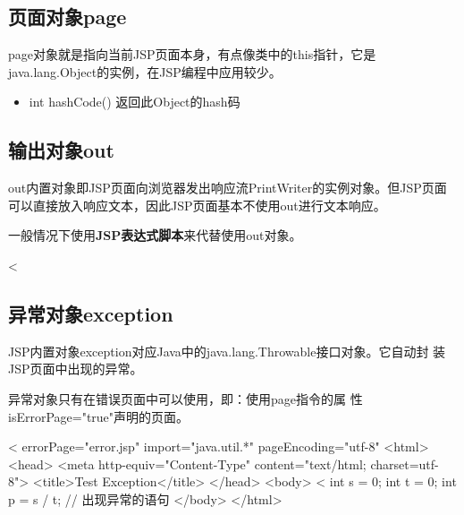 \subsection{页面对象page} 

page对象就是指向当前JSP页面本身，有点像类中的this指针，它是java.lang.Object的实例，在JSP编程中应用较少。

\begin{itemize}
\item int hashCode() 返回此Object的hash码
\end{itemize}


\subsection{输出对象out}

out内置对象即JSP页面向浏览器发出响应流PrintWriter的实例对象。但JSP页面
可以直接放入响应文本，因此JSP页面基本不使用out进行文本响应。

一般情况下使用{\bf\Red JSP表达式脚本}来代替使用out对象。

\begin{jspCode}
  <%
\end{jspCode}

\subsection{异常对象exception} 

JSP内置对象exception对应Java中的java.lang.Throwable接口对象。它自动封
装JSP页面中出现的异常。

异常对象只有在{\hei\Blue 错误页面}中可以使用，即：{\kai\Red 使用page指令的属
  性{\Blue isErrorPage="true"}声明的页面。}


\begin{jspCode}
  <%
    errorPage="error.jsp" import="java.util.*" pageEncoding="utf-8" %
  <html>
    <head>
      <meta http-equiv="Content-Type" content="text/html; charset=utf-8">
      <title>Test Exception</title>
    </head>
    <body>
      <%
        int s = 0;
        int t = 0; 
        int p = s / t; // 出现异常的语句
    </body>
  </html>  
\end{jspCode}

